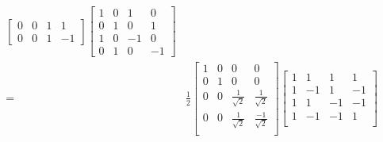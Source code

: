 \documentclass[11pt,a4paper]{article}
\begin{document}
\begin{enumerate}
\begin{enumerate}
\begin{align*}
\begin{bmatrix}
                                                                0 & 0  & 1 & 1  \\
                                                                0 & 0  & 1 & -1
                                                            \end{bmatrix} \begin{bmatrix}
                                                                              1 & 0 & 1  & 0  \\
                                                                              0 & 1 & 0  & 1  \\
                                                                              1 & 0 & -1 & 0  \\
                                                                              0 & 1 & 0  & -1
                                                                          \end{bmatrix}                                                                                         \\
                        = & \frac{1}{2} \begin{bmatrix}
                                            1 & 0 & 0                  & 0                   \\
                                            0 & 1 & 0                  & 0                   \\
                                            0 & 0 & \frac{1}{\sqrt{2}} & \frac{1}{\sqrt{2}}  \\
                                            0 & 0 & \frac{1}{\sqrt{2}} & \frac{-1}{\sqrt{2}} \\
                                        \end{bmatrix} \begin{bmatrix}
                                                          1 & 1  & 1  & 1  \\
                                                          1 & -1 & 1  & -1 \\
                                                          1 & 1  & -1 & -1 \\
                                                          1 & -1 & -1 & 1  \\
                                                      \end{bmatrix}                                                                             \\

\end{align*}
\end{enumerate}
\end{enumerate}
\end{document}

